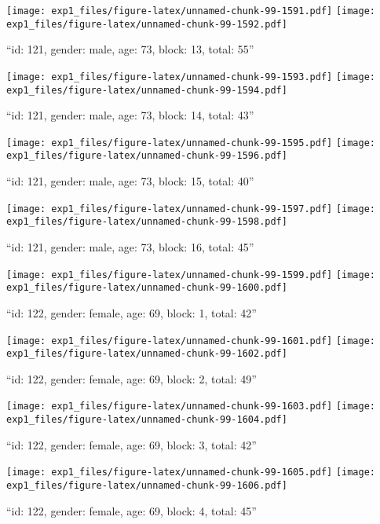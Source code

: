 \documentclass[,]{article}
\begin{document}
\texttt{[image: exp1\_files/figure-latex/unnamed-chunk-99-1591.pdf]}
\texttt{[image: exp1\_files/figure-latex/unnamed-chunk-99-1592.pdf]}

\newpage
[1] 

``id: 121, gender: male, age: 73, block: 13, total: 55''

\texttt{[image: exp1\_files/figure-latex/unnamed-chunk-99-1593.pdf]}
\texttt{[image: exp1\_files/figure-latex/unnamed-chunk-99-1594.pdf]}

\newpage
[1] 

``id: 121, gender: male, age: 73, block: 14, total: 43''

\texttt{[image: exp1\_files/figure-latex/unnamed-chunk-99-1595.pdf]}
\texttt{[image: exp1\_files/figure-latex/unnamed-chunk-99-1596.pdf]}

\newpage
[1] 

``id: 121, gender: male, age: 73, block: 15, total: 40''

\texttt{[image: exp1\_files/figure-latex/unnamed-chunk-99-1597.pdf]}
\texttt{[image: exp1\_files/figure-latex/unnamed-chunk-99-1598.pdf]}

\newpage
[1] 

``id: 121, gender: male, age: 73, block: 16, total: 45''

\texttt{[image: exp1\_files/figure-latex/unnamed-chunk-99-1599.pdf]}
\texttt{[image: exp1\_files/figure-latex/unnamed-chunk-99-1600.pdf]}

\newpage
[1] 

``id: 122, gender: female, age: 69, block: 1, total: 42''

\texttt{[image: exp1\_files/figure-latex/unnamed-chunk-99-1601.pdf]}
\texttt{[image: exp1\_files/figure-latex/unnamed-chunk-99-1602.pdf]}

\newpage
[1] 

``id: 122, gender: female, age: 69, block: 2, total: 49''

\texttt{[image: exp1\_files/figure-latex/unnamed-chunk-99-1603.pdf]}
\texttt{[image: exp1\_files/figure-latex/unnamed-chunk-99-1604.pdf]}

\newpage
[1] 

``id: 122, gender: female, age: 69, block: 3, total: 42''

\texttt{[image: exp1\_files/figure-latex/unnamed-chunk-99-1605.pdf]}
\texttt{[image: exp1\_files/figure-latex/unnamed-chunk-99-1606.pdf]}

\newpage
[1] 

``id: 122, gender: female, age: 69, block: 4, total: 45''
\end{document}

